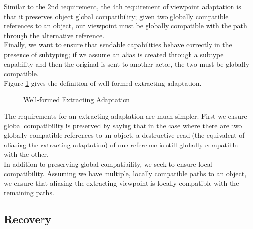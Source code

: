 Similar to the 2nd requirement, the 4th requirement of viewpoint adaptation is that it preserves object global compatibility; given two globally compatible references to an object, our viewpoint must be globally compatible with the path through the alternative reference. \\

Finally, we want to ensure that sendable capabilities behave correctly in the presence of subtyping; if we assume an alias is created through a subtype capability and then the original is sent to another actor, the two must be globally compatible. \\

Figure \ref{fig:degen-extract} gives the definition of well-formed extracting adaptation.

\begin{figure}[H]
    \centering
    \begin{mathpar}
    \end{mathpar}
    \caption{Well-formed Extracting Adaptation}
    \label{fig:degen-extract}
\end{figure}

The requirements for an extracting adaptation are much simpler. First we ensure global compatibility is preserved by saying that in the case where there are two globally compatible references to an object, a destructive read (the equivalent of aliasing the extracting adaptation) of one reference is still globally compatible with the other. \\

In addition to preserving global compatibility, we seek to ensure local compatibility. Assuming we have multiple, locally compatible paths to an object, we ensure that aliasing the extracting viewpoint is locally compatible with the remaining paths.

\subsection{Recovery}


